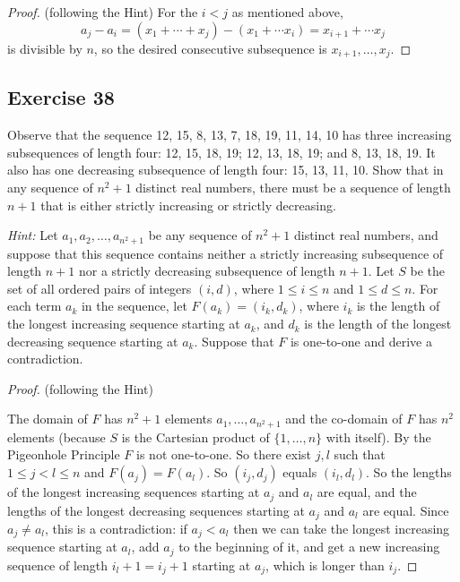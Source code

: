 \documentclass[14pt]{extarticle}
\begin{document}
\begin{proof}
     (following the Hint) For the \(i < j\) as mentioned above,
     \[
          a_j - a_i = (x_1 + \cdots + x_j) - (x_1 + \cdots x_i) = x_{i+1} + \cdots x_j
     \]
     is divisible by \(n\), so the desired consecutive subsequence is \(x_{i+1}, \ldots, x_j\).
\end{proof}

\subsection{Exercise 38}
Observe that the sequence 12, 15, 8, 13, 7, 18, 19, 11, 14, 10 has three increasing subsequences of length four: 12,
15, 18, 19; 12, 13, 18, 19; and 8, 13, 18, 19. It also has one decreasing subsequence of length four: 15, 13, 11, 10.
Show that in any sequence of \(n^2 + 1\) distinct real numbers, there must be a sequence of length \(n + 1\) that
is either strictly increasing or strictly decreasing.

     {\it Hint:} Let \(a_1, a_2, \ldots, a_{n^2+1}\) be any sequence of \(n^2 + 1\) distinct real numbers, and suppose
that this sequence contains neither a strictly increasing subsequence of length \(n + 1\) nor a strictly decreasing
subsequence of length \(n + 1\). Let \(S\) be the set of all ordered pairs of integers \((i, d)\), where \(1 \leq i
\leq n\) and \(1 \leq d \leq n\). For each term \(a_k\) in the sequence, let \(F(a_k) = (i_k, d_k)\), where \(i_k\) is
the length of the longest increasing sequence starting at \(a_k\), and \(d_k\) is the length of the longest decreasing
sequence starting at \(a_k\). Suppose that \(F\) is one-to-one and derive a contradiction.

\begin{proof}
     (following the Hint)

     The domain of \(F\) has \(n^2+1\) elements \(a_1, \ldots, a_{n^2+1}\) and the co-domain of \(F\) has \(n^2\) elements
     (because \(S\) is the Cartesian product of \(\{1, \ldots, n\}\) with itself). By the Pigeonhole Principle \(F\) is
     not one-to-one. So there exist \(j,l\) such that \(1 \leq j < l \leq n\) and \(F(a_j) = F(a_l)\). So \((i_j, d_j)\)
     equals \((i_l, d_l)\). So the lengths of the longest increasing sequences starting at \(a_j\) and \(a_l\) are
     equal, and the lengths of the longest decreasing sequences starting at \(a_j\) and \(a_l\) are equal. Since \(a_j \neq
     a_l\), this is a contradiction: if \(a_j < a_l\) then we can take the longest increasing sequence starting at
     \(a_l\), add \(a_j\) to the beginning of it, and get a new increasing sequence of length \(i_l + 1 = i_j + 1\)
     starting at \(a_j\), which is longer than \(i_j\).
\end{proof}
\end{document}
